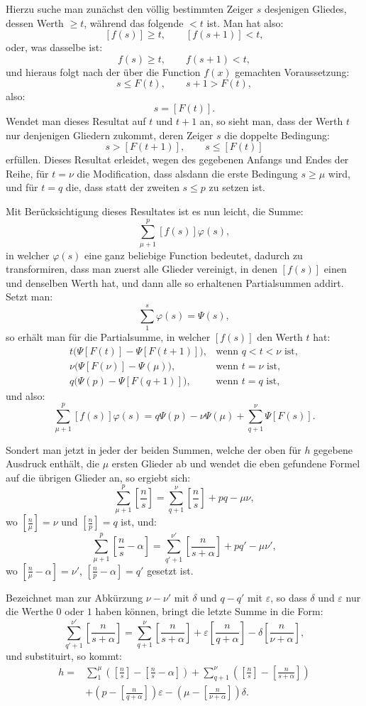 \documentclass[11pt]{article}
\newcommand{\floor}[1]{\left[#1\right]}
\begin{document}
Hierzu suche man zunächst den völlig bestimmten Zeiger $s$ desjenigen Gliedes, dessen Werth $\geq t$, während das folgende $<t$ ist. Man hat also:
\[
 [f(s)]\geq t,\qquad [f(s+1)]<t,
\]
oder, was dasselbe ist:
\[
 f(s)\geq t,\qquad f(s+1)<t,
\]
und hieraus folgt nach der über die Function $f(x)$ gemachten Voraussetzung:
\[
 s\leq F(t),\qquad s+1>F(t),
\]
also:
\[
 s=\floor{F(t)}.
\]
Wendet man dieses Resultat auf $t$ und $t+1$ an, so sieht man, dass der Werth $t$ nur denjenigen Gliedern zukommt, deren Zeiger $s$ die doppelte Bedingung:
\[
 s>\floor{F(t+1)},\qquad s\leq\floor{F(t)}
\]
erfüllen. Dieses Resultat erleidet, wegen des gegebenen Anfangs und Endes der Reihe, für $t=\nu$ die Modification, dass alsdann die erste Bedingung $s\geq\mu$ wird, und für $t=q$ die, dass statt der zweiten $s\leq p$ zu setzen ist.

Mit Berücksichtigung dieses Resultates ist es nun leicht, die Summe:
\[
 \sum_{\mu+1}^{p}[f(s)]\varphi(s),
\]
in welcher $\varphi(s)$ eine ganz beliebige Function bedeutet, dadurch zu transformiren, dass man zuerst alle Glieder vereinigt, in denen $[f(s)]$ einen und denselben Werth hat, und dann alle so erhaltenen Partialsummen addirt. Setzt man:
\[
 \sum_1^s\varphi(s)=\Psi(s),
\]
so erhält man für die Partialsumme, in welcher $[f(s)]$ den Werth $t$ hat:
\[
\begin{array}{ll}
 t\bigl(\Psi[F(t)]-\Psi[F(t+1)]\bigr), & \text{wenn } q<t<\nu \text{ ist},\\[0.3em]
 \nu\bigl(\Psi[F(\nu)]-\Psi(\mu)\bigr), & \text{wenn } t=\nu \text{ ist},\\[0.3em]
 q\bigl(\Psi(p)-\Psi[F(q+1)]\bigr), & \text{wenn } t=q \text{ ist},
\end{array}
\]
und also:
\[
 \sum_{\mu+1}^{p}[f(s)]\varphi(s)
 =q\Psi(p)-\nu\Psi(\mu)+\sum_{q+1}^{\nu}\Psi[F(s)].
\]

Sondert man jetzt in jeder der beiden Summen, welche der oben für $h$ gegebene Ausdruck enthält, die $\mu$ ersten Glieder ab und wendet die eben gefundene Formel auf die übrigen Glieder an, so ergiebt sich:
\[
 \sum_{\mu+1}^{p}\floor{\frac ns}=\sum_{q+1}^{\nu}\floor{\frac ns}+pq-\mu\nu,
\]
wo $\floor{\frac n\mu}=\nu$ und $\floor{\frac np}=q$ ist, und:
\[
 \sum_{\mu+1}^{p}\floor{\frac ns-\alpha}=\sum_{q'+1}^{\nu'}\floor{\frac n{s+\alpha}}+pq'-\mu\nu',
\]
wo $\floor{\frac n\mu-\alpha}=\nu'$, $\floor{\frac np-\alpha}=q'$ gesetzt ist.

Bezeichnet man zur Abkürzung $\nu-\nu'$ mit $\delta$ und $q-q'$ mit $\varepsilon$, so dass $\delta$ und $\varepsilon$ nur die Werthe $0$ oder $1$ haben können, bringt die letzte Summe in die Form:
\[
 \sum_{q'+1}^{\nu'}\floor{\frac n{s+\alpha}}
 =\sum_{q+1}^{\nu}\floor{\frac n{s+\alpha}}
 +\varepsilon\floor{\frac n{q+\alpha}}
 -\delta\floor{\frac n{\nu+\alpha}},
\]
und substituirt, so kommt:
\[
\begin{aligned}
 h={}&\sum_1^{\mu}\left(\floor{\frac ns}-\floor{\frac ns-\alpha}\right)
 +\sum_{q+1}^{\nu}\left(\floor{\frac ns}-\floor{\frac n{s+\alpha}}\right) \\
 &+\left(p-\floor{\frac n{q+\alpha}}\right)\varepsilon
 -\left(\mu-\floor{\frac n{\nu+\alpha}}\right)\delta.
\end{aligned}
\]
\end{document}
